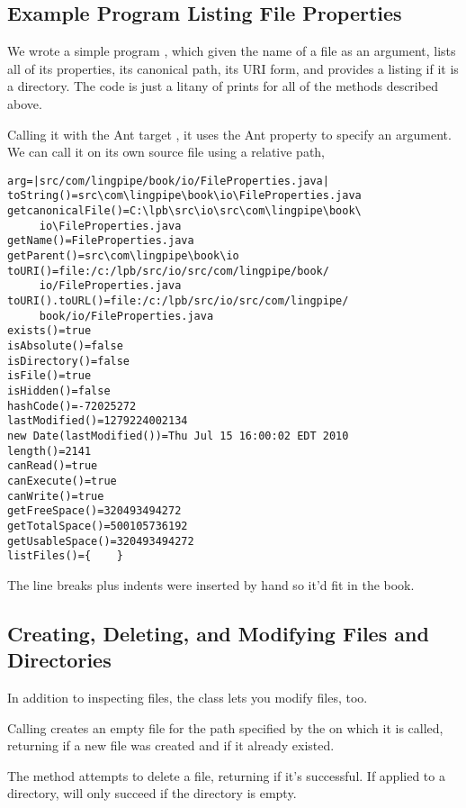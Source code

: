 \subsection{Example Program Listing File Properties}

We wrote a simple program , which given the name
of a file as an argument, lists all of its properties, its canonical
path, its URI form, and provides a listing if it is a directory.  The
code is just a litany of prints for all of the methods described above.

Calling it with the Ant target , it uses the
 Ant property to specify an argument.  We can call it
on its own source file using a relative path,
%
%
\begin{verbatim}
arg=|src/com/lingpipe/book/io/FileProperties.java|
toString()=src\com\lingpipe\book\io\FileProperties.java
getcanonicalFile()=C:\lpb\src\io\src\com\lingpipe\book\
     io\FileProperties.java
getName()=FileProperties.java
getParent()=src\com\lingpipe\book\io
toURI()=file:/c:/lpb/src/io/src/com/lingpipe/book/
     io/FileProperties.java
toURI().toURL()=file:/c:/lpb/src/io/src/com/lingpipe/
     book/io/FileProperties.java
exists()=true
isAbsolute()=false
isDirectory()=false
isFile()=true
isHidden()=false
hashCode()=-72025272
lastModified()=1279224002134
new Date(lastModified())=Thu Jul 15 16:00:02 EDT 2010
length()=2141
canRead()=true
canExecute()=true
canWrite()=true
getFreeSpace()=320493494272
getTotalSpace()=500105736192
getUsableSpace()=320493494272
listFiles()={    }
\end{verbatim}
%
The line breaks plus indents were inserted by hand so it'd fit in the
book.

\subsection{Creating, Deleting, and Modifying Files and Directories}

In addition to inspecting files, the  class lets you modify
files, too.  

Calling  creates an empty file for the path
specified by the \code{File} on which it is called, returning
 if a new file was created and  if it already
existed.

The  method attempts to delete a file, returning
 if it's successful.  If applied to a directory, 
will only succeed if the directory is empty.

